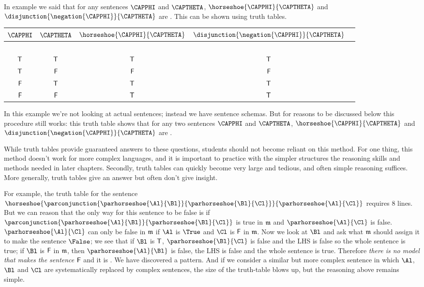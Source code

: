 \begin{majorILnc}{}
In example  we said that for any \GSL{} sentences $\CAPPHI$ and $\CAPTHETA$, $\horseshoe{\CAPPHI}{\CAPTHETA}$ and $\disjunction{\negation{\CAPPHI}}{\CAPTHETA}$ are . 
This can be shown using truth tables. 
\begin{center}
\begin{tabular}{ c c c c c }
$\CAPPHI$ & $\CAPTHETA$ & $\horseshoe{\CAPPHI}{\CAPTHETA}$ & $\disjunction{\negation{\CAPPHI}}{\CAPTHETA}$ & \\
\hline
$ $ & $ $ & & & \\[-.25cm]
$\mathsf{T}$ & $\mathsf{T}$ & $\mathsf{T}$ & $\mathsf{T}$ \\
$\mathsf{T}$ & $\mathsf{F}$& $\mathsf{F}$ & $\mathsf{F}$ \\
$\mathsf{F}$ & $\mathsf{T}$ & $\mathsf{T}$ & $\mathsf{T}$\\
$\mathsf{F}$ & $\mathsf{F}$  & $\mathsf{T}$ & $\mathsf{T}$\\
\end{tabular}
\end{center}
In this example we're not looking at actual \GSL{} sentences; instead we have sentence schemas. 
But for reasons to be discussed below this procedure still works: this truth table shows that for any two sentences $\CAPPHI$ and $\CAPTHETA$, $\horseshoe{\CAPPHI}{\CAPTHETA}$ and $\disjunction{\negation{\CAPPHI}}{\CAPTHETA}$ are .
\end{majorILnc}
While truth tables provide guaranteed answers to these questions, students should not become reliant on this method. 
For one thing, this method doesn't work for more complex languages, and it is important to practice with the simpler \GSL{} structures the reasoning skills and methods needed in later chapters. 
Secondly, truth tables can quickly become very large and tedious, and often simple reasoning suffices. 
More generally, truth tables give an answer but often don’t give insight.

For example, the truth table for the sentence $\horseshoe{\parconjunction{\parhorseshoe{\Al}{\Bl}}{\parhorseshoe{\Bl}{\Cl}}}{\parhorseshoe{\Al}{\Cl}}$ requires 8 lines. 
But we can reason that the only way for this sentence to be false is if $\parconjunction{\parhorseshoe{\Al}{\Bl}}{\parhorseshoe{\Bl}{\Cl}}$ is true in $\mathfrak{m}$ and $\parhorseshoe{\Al}{\Cl}$ is false. 
$\parhorseshoe{\Al}{\Cl}$ can only be false in $\mathfrak{m}$ if $\Al$ is $\True$ and $\Cl$ is $\mathsf{F}$ in $\mathfrak{m}$. 
Now we look at $\Bl$ and ask what $\mathfrak{m}$ should assign it to make the sentence $\False$; 
we see that if $\Bl$ is $\mathsf{T}$, $\parhorseshoe{\Bl}{\Cl}$ is false and the LHS is false so the whole sentence is true; 
if $\Bl$ is $\mathsf{F}$ in $\mathfrak{m}$, then $\parhorseshoe{\Al}{\Bl}$ is false, the LHS is false and the whole sentence is true. 
Therefore \emph{there is no model that makes the sentence $\mathsf{F}$} and it is . 
We have discovered a pattern. 
And if we consider a similar but more complex sentence in which $\Al$, $\Bl$ and $\Cl$ are systematically replaced by complex sentences, the size of the truth-table blows up, but the reasoning above remains simple.



